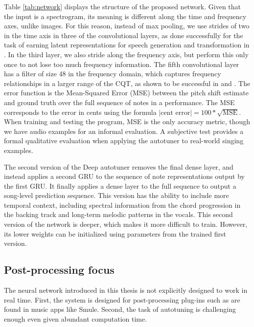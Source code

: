 Table \ref{tab:network} displays the structure of the proposed network. Given that the input is a spectrogram, its meaning is different along the time and frequency axes, unlike images. For this reason, instead of max pooling, we use strides of two in the time axis in three of the convolutional layers, as done successfully for the task of earning latent representations for speech generation and transformation in \cite{hsu2017learning}. In the third layer, we also stride along the frequency axis, but perform this only once to not lose too much frequency information. The fifth convolutional layer has a filter of size 48 in the frequency domain, which captures frequency relationships in a larger range of the CQT, as shown to be successful in \cite{bittner2017deep} and \cite{hsu2017learning}. 
The error function is the Mean-Squared Error (MSE) between the pitch shift estimate and ground truth over the full sequence of notes in a performance. The MSE corresponds to the error in cents using the formula $\left|\text{cent error}\right| = 100 * \sqrt{\text{MSE}}$. When training and testing the program, MSE is the only accuracy metric, though we have audio examples for an informal evaluation. A subjective test provides a formal qualitative evaluation when applying the autotuner to real-world singing examples.

The second version of the Deep autotuner removes the final dense layer, and instead applies a second GRU to the sequence of note representations output by the first GRU. It finally applies a dense layer to the full sequence to output a song-level prediction sequence. This version has the ability to include more temporal context, including spectral information from the chord progression in the backing track and long-term melodic patterns in the vocals. This second version of the network is deeper, which makes it more difficult to train. However, its lower weights can be initialized using parameters from the trained first version.

\subsection{Post-processing focus}
The neural network introduced in this thesis is not explicitly designed to work in real time. First, the system is designed for post-processing plug-ins such as are found in music apps like Smule. Second, the task of autotuning is challenging enough even given abundant computation time. 

